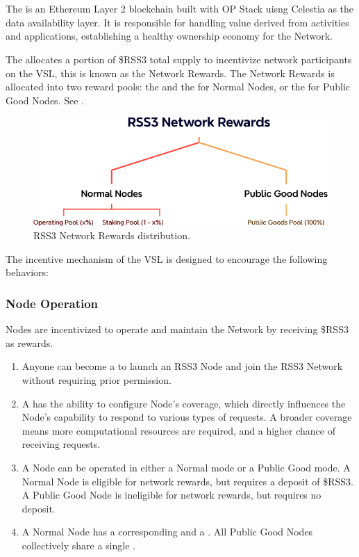 \section{}
\label{sec:VSL}

The  is an Ethereum Layer 2 blockchain built with OP Stack uisng Celestia as the data availability layer.
It is responsible for handling value derived from  activities and applications, establishing a healthy ownership economy for the Network.

The  allocates a portion of \$RSS3 total supply to incentivize network participants on the \gls{VSL}, this is known as the Network Rewards.
The Network Rewards is allocated into two reward pools: the  and the  for Normal Nodes, or the  for Public Good Nodes. See .

{
\begin{figure}[tb!]
    \centering
    \includegraphics[width=0.8\columnwidth]{figures/network-rewards.png}
    \caption{RSS3 Network Rewards distribution.}
    \label{fig:network-rewards}
\end{figure}
}

The incentive mechanism of the \gls{VSL} is designed to encourage the following behaviors:

\subsubsection{Node Operation}
Nodes are incentivized to operate and maintain the Network by receiving \$RSS3 as rewards.
\begin{enumerate}
    \item Anyone can become a  to launch an RSS3 Node and join the RSS3 Network without requiring prior permission.
    \item A  has the ability to configure Node's coverage, which directly influences the Node's capability to respond to various types of requests. A broader coverage means more computational resources are required, and a higher chance of receiving requests.
    \item A Node can be operated in either a Normal mode or a Public Good mode. A Normal Node is eligible for network rewards, but requires a deposit of \$RSS3. A Public Good Node is ineligible for network rewards, but requires no deposit.
    \item A Normal Node has a corresponding  and a . All Public Good Nodes collectively share a single .
\end{enumerate}

